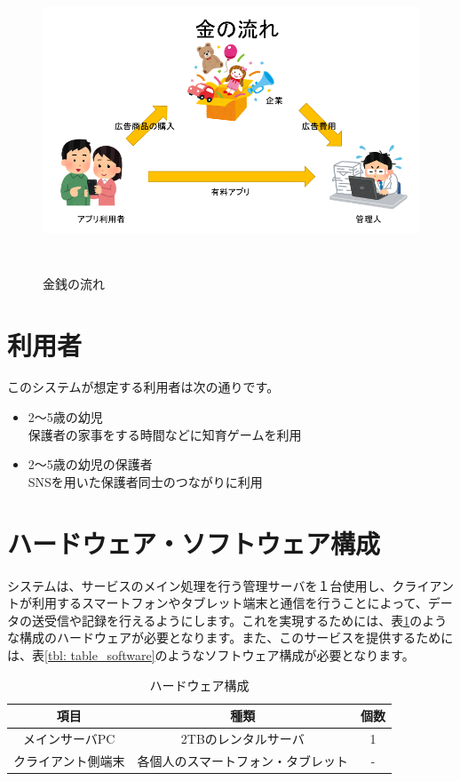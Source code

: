 \documentclass[a4j]{jarticle}
\begin{document}
\begin{figure}[h]
  \begin{center}
    \includegraphics[width = 14cm, height = 9cm]{section5_money.png}
    \caption{金銭の流れ}
    \label{money}
  \end{center}
\end{figure}

\section{利用者}
このシステムが想定する利用者は次の通りです。

\begin{itemize}
\item 2～5歳の幼児\\
  保護者の家事をする時間などに知育ゲームを利用
\item 2～5歳の幼児の保護者\\
  SNSを用いた保護者同士のつながりに利用
\end{itemize}

\section{ハードウェア・ソフトウェア構成}
システムは、サービスのメイン処理を行う管理サーバを１台使用し、クライアントが利用するスマートフォンやタブレット端末と通信を行うことによって、データの送受信や記録を行えるようにします。これを実現するためには、表\ref{tbl: table_hardware}のような構成のハードウェアが必要となります。また、このサービスを提供するためには、表\ref{tbl: table_software}のようなソフトウェア構成が必要となります。

\begin{table}[H]
    \caption{ハードウェア構成}
    \label{tbl: table_hardware}
    \begin{center}
        \begin{tabular}{|c|c|c|} \hline
            項目 & 種類　&  個数\\ \hline
            メインサーバPC & 2TBのレンタルサーバ & 1\\ \hline
            クライアント側端末 & 各個人のスマートフォン・タブレット  & - \\ \hline
        \end{tabular}
    \end{center}
\end{table}
\end{document}
